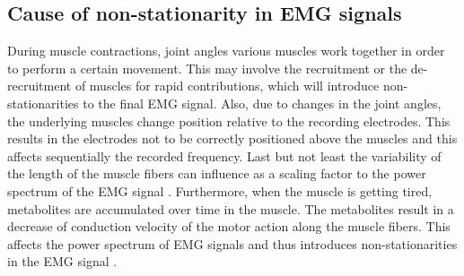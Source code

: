 \subsection{Cause of non-stationarity in EMG signals}
During muscle contractions, joint angles various muscles work together in order to perform a certain movement. This may involve the recruitment or the de-recruitment of muscles for rapid contributions, which will introduce non-stationarities to the final EMG signal. Also, due to changes in the joint angles, the underlying muscles change position relative to the recording electrodes. This results in the electrodes not to be correctly positioned above the muscles and this affects sequentially the recorded frequency. Last but not least the variability of the length of the muscle fibers can influence as a scaling factor to the power spectrum of the EMG signal \cite{bonato_time-frequency_2001}. Furthermore, when the muscle is getting tired, metabolites are accumulated over time in the muscle. The metabolites result in a decrease of conduction velocity of the motor action along the muscle fibers. This affects the power spectrum of EMG signals and thus introduces non-stationarities in the EMG signal \cite{bonato_time-frequency_2001}. \\

